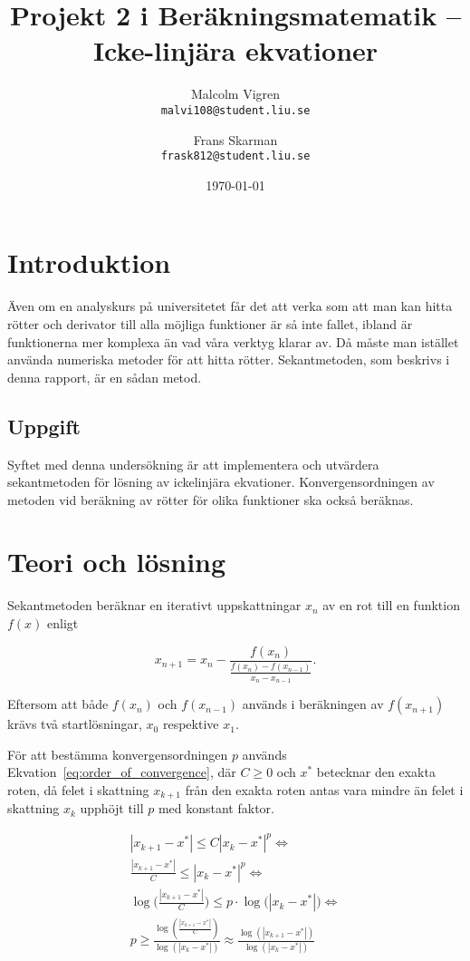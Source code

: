 \documentclass[a4paper,titlepage]{article}
\title{%
    \textbf{Projekt 2 i Beräkningsmatematik -- Icke-linjära ekvationer }}
\date{\today}
\author{%
    Malcolm Vigren \\
    \texttt{malvi108@student.liu.se}
    \and
    Frans Skarman\\
    \texttt{frask812@student.liu.se}
    }
\begin{document}
\maketitle
\newpage
\tableofcontents
\newpage

\section{Introduktion}

Även om en analyskurs på universitetet får det att verka som att man kan hitta rötter
och derivator till alla möjliga funktioner är så inte fallet, ibland är funktionerna
mer komplexa än vad våra verktyg klarar av. Då måste man istället använda
numeriska metoder för att hitta rötter. Sekantmetoden, som beskrivs i denna
rapport, är en sådan metod.

\subsection{Uppgift}

Syftet med denna undersökning är att implementera och utvärdera sekantmetoden
för lösning av ickelinjära ekvationer. Konvergensordningen av metoden vid
beräkning av rötter för olika funktioner ska också beräknas.

\section{Teori och lösning}

Sekantmetoden beräknar en iterativt uppskattningar $x_n$ av en rot till en
funktion $f(x)$ enligt

\begin{equation}
    \label{eq:seq}
    x_{n+1} = x_{n} -
    \frac{f(x_n)}
        {\frac{f(x_n) - f(x_{n-1})}
                {x_n - x_{n-1}}
        }.
\end{equation}

Eftersom att både $f(x_n)$ och $f(x_{n-1})$ används i beräkningen av $f(x_{n+1})$ krävs
två startlösningar, $x_0$ respektive $x_1$.

För att bestämma konvergensordningen $p$ används Ekvation~\ref{eq:order_of_convergence}, där
$C \geq 0$ och $x^*$ betecknar den exakta roten, då felet i skattning $x_{k+1}$ 
från den exakta roten antas vara mindre än felet i skattning $x_{k}$ upphöjt till
$p$ med konstant faktor.

\begin{equation}
    \begin{gathered}
        |x_{k+1} - x^*| \leq C |x_k - x^*|^p \Leftrightarrow \\
        \frac{|x_{k+1} - x^*|}{C} \leq |x_{k} - x^*|^p \Leftrightarrow \\
        \log\big(\frac{|x_{k+1} - x^*|}{C} \big) \leq
            p \cdot \log\big(|x_{k} - x^*|\big) \Leftrightarrow \\
        p \geq \frac{\log(\frac{|x_{k+1} - x^*|}{C})}
            {\log(|x_{k} - x^*|)}
        \approx \frac{\log(|x_{k+1} - x^*|)}
            {\log(|x_{k} - x^*|)}\\
    \end{gathered}
    \label{eq:order_of_convergence}
\end{equation}
\end{document}
